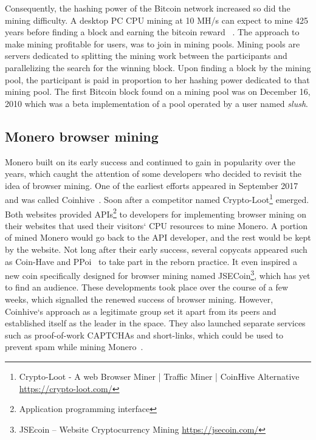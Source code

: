 Consequently, the hashing power of the Bitcoin network increased so did the mining difficulty. A desktop PC CPU mining at 10 MH/s can expect to mine 425 years before finding a  block and earning the bitcoin reward ~\cite{huang2014botcoin}. The approach to make mining profitable for users, was to join in mining pools. Mining pools are servers dedicated to splitting the mining work between the participants and parallelizing the search for the winning block. Upon finding a block by the mining pool, the participant is paid in proportion to her hashing power dedicated to that mining pool. The first Bitcoin block found on a mining pool was on December 16, 2010 which was a beta implementation of a pool operated by a user named \textit{slush}.


\subsection{Monero browser mining}
Monero built on its early success and continued to gain in popularity over the years, which caught the attention of some developers who decided to revisit the idea of browser mining. One of the earliest efforts appeared in September 2017 and was called Coinhive~\cite{coinhive}. Soon after a competitor named Crypto-Loot\footnote{Crypto-Loot - A web Browser Miner | Traffic Miner | CoinHive Alternative \url{https://crypto-loot.com/}} emerged. Both websites provided APIs\footnote{Application programming interface} to developers for implementing browser mining on their websites that used their visitors` CPU resources to mine Monero. A portion of mined Monero would go back to the API developer, and the rest would be kept by the website. Not long after their early success, several copycats appeared such as Coin-Have and PPoi~\cite{coinhivecopycats} to take part in the reborn practice. It even inspired a new coin specifically designed for browser mining named JSECoin\footnote{JSEcoin – Website Cryptocurrency Mining \url{https://jsecoin.com/}}, which has yet to find an audience. These developments took place over the course of a few weeks, which signalled the renewed success of browser mining. However, Coinhive`s approach as a legitimate group set it apart from its peers and established itself as the leader in the space. They also launched separate services such as proof-of-work CAPTCHAs and short-links, which could be used to prevent spam while mining Monero~\cite{coinhive}.


